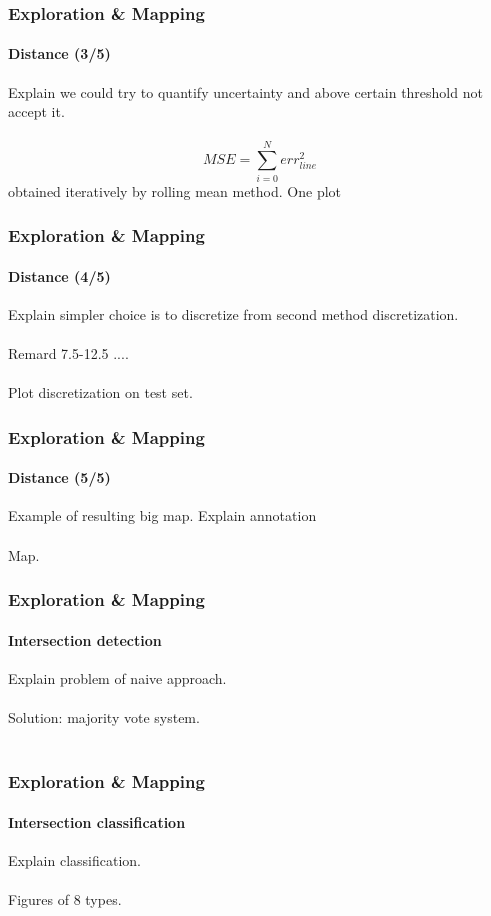 \documentclass{beamer}
\begin{document}
\begin{frame}
\frametitle{Exploration \& Mapping}
\framesubtitle{Distance (3/5)}
Explain we could try to quantify uncertainty and above certain threshold not accept it.\\~\\
$$
	MSE = \sum_{i=0}^N err_{line}^2
$$
obtained iteratively by rolling mean method.
One plot 
\end{frame}


\begin{frame}
\frametitle{Exploration \& Mapping}
\framesubtitle{Distance (4/5)}
Explain simpler choice is to discretize from second method discretization.\\~\\
Remard 7.5-12.5 ....\\~\\
Plot discretization on test set.
\end{frame}


\begin{frame}
\frametitle{Exploration \& Mapping}
\framesubtitle{Distance (5/5)}
Example of resulting big map. Explain annotation\\~\\
Map.
\end{frame}


\begin{frame}
\frametitle{Exploration \& Mapping}
\framesubtitle{Intersection detection}
Explain problem of naive approach.\\~\\
Solution: majority vote system.\\~\\
\end{frame}


\begin{frame}
\frametitle{Exploration \& Mapping}
\framesubtitle{Intersection classification}
Explain classification.\\~\\
Figures of 8 types.\\~\\
\end{frame}
\end{document}
